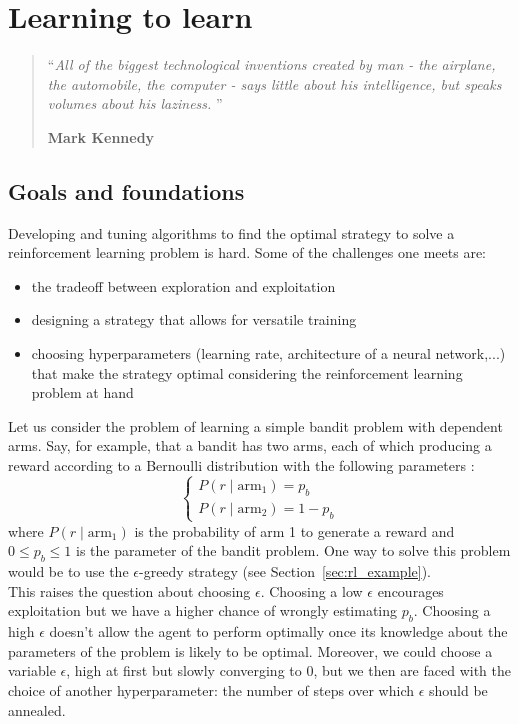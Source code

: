 \chapter{Learning to learn}
\begin{quotation}
\noindent ``\emph{All of the biggest technological inventions created by man -
	the airplane, the automobile, the computer - says little about his 
	intelligence, but speaks volumes about his laziness.  }''
\begin{flushright}\textbf{Mark Kennedy}\end{flushright}
\end{quotation}

\vspace*{0.5cm}

\section{Goals and foundations}
Developing and tuning algorithms to find the optimal strategy to solve a
reinforcement learning problem is hard. Some of the challenges one meets are:
\begin{itemize}
	\item the tradeoff between exploration and exploitation
	\item designing a strategy that allows for versatile training
	\item choosing hyperparameters (learning rate, architecture of a
		neural network,...)  that make the strategy
		optimal considering the reinforcement learning problem at hand
\end{itemize}

Let us consider the problem of learning a simple bandit problem with dependent
arms. Say, for example, that a bandit has two arms, each of which producing
a reward according to a Bernoulli distribution with the following parameters :
$$ \begin{cases} P(r \mid \text{arm}_1) = p_b \\ 
P(r \mid \text{arm}_2) = 1 - p_b  \end{cases} $$
where $P(r \mid \text{arm}_1)$ is the probability of arm 1 to generate a reward
and $0 \leq p_b \leq 1$ is the parameter of the bandit problem. One way to
solve this problem would be to use the $\epsilon$-greedy strategy (see
Section~\ref{sec:rl_example}). \\

This raises the question about choosing $\epsilon$. Choosing a low $\epsilon$
encourages exploitation but we have a higher chance of wrongly estimating $p_b$.
Choosing a high $\epsilon$ doesn't allow the agent to perform optimally once
its knowledge about the parameters of the problem is likely to be optimal.
Moreover, we could choose a variable $\epsilon$, high at first but slowly
converging to 0, but we then are faced with the choice of another
hyperparameter: the number of steps over which $\epsilon$ should be annealed.\\

